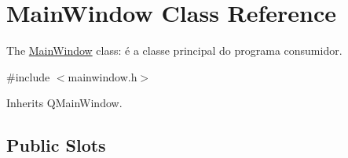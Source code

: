 \hypertarget{class_main_window}{}\section{Main\+Window Class Reference}
\label{class_main_window}


The \hyperlink{class_main_window}{Main\+Window} class\+: é a classe principal do programa consumidor.  




{\ttfamily \#include $<$mainwindow.\+h$>$}



Inherits Q\+Main\+Window.

\subsection*{Public Slots}
